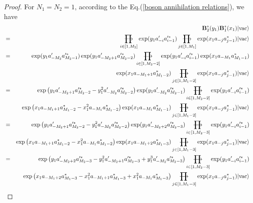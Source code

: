 \documentclass[11pt,reqno]{amsart}
\numberwithin{equation}{section}
\def\rprod{\mathop{\prod{\mkern-28.0mu}{\mathbf\longrightarrow}}}
\begin{document}
\begin{proof}
For $N_{1}=N_{2}=1$, according to the Eq.(\ref{boson annihilation relations}), we have
\begin{eqnarray}
&&\mathbf{B}^{\ast}_{2}(y_{1})\mathbf{B}^{\ast}_{1}(x_{1})|\text{vac}\rangle\notag\\
&=&\rprod\limits
_{i\in[1,M_{2}]}\exp(y_{1}a^{\prime}_{-i}a^{\prime\ast}_{i-1})\rprod\limits
_{j\in[1,M_{1}]}\exp(x_{1}a_{-j}a^{\ast}_{j-1})|\text{vac}\rangle\notag\\
&=&\exp(y_{1}a^{\prime}_{-M_{2}}a^{\prime\ast}_{M_{2}-1})
\exp(y_{1}a^{\prime}_{-M_{2}+1}a^{\prime\ast}_{M_{2}-2})\rprod\limits
_{i\in[1,M_{2}-2]}\exp(y_{1}a^{\prime}_{-i}a^{\prime\ast}_{i-1})\exp(x_{1}a_{-M_{1}}
a^{\ast}_{M_{1}-1})\notag\\
&&\exp(x_{1}a_{-M_{1}+1}a^{\ast}_{M_{1}-2})\rprod\limits
_{j\in[1,M_{1}-2]}\exp(x_{1}a_{-j}a^{\ast}_{j-1})|\text{vac}\rangle\notag\\
&=&\exp\left(y_{1}a^{\prime}_{-M_{2}+1}a^{\prime\ast}_{M_{2}-2}-y^{2}_{1}
a^{\prime}_{-M_{2}}a^{\prime\ast}_{M_{2}-2}\right)
\exp(y_{1}a^{\prime}_{-M_{2}}a^{\prime\ast}_{M_{2}-1})\rprod\limits
_{i\in[1,M_{2}-2]}\exp(y_{1}a^{\prime}_{-i}a^{\prime\ast}_{i-1})\notag\\
&&\exp\left(x_{1}a_{-M_{1}+1}a^{\ast}_{M_{1}-2}-x^{2}_{1}a_{-M_{1}}a^{\ast}_{M_{1}-2}\right)
\exp(x_{1}a_{-M_{1}}a^{\ast}_{M_{1}-1})\rprod\limits
_{j\in[1,M_{1}-2]}\exp(x_{1}a_{-j}a^{\ast}_{j-1})|\text{vac}\rangle\notag\\
&=&\exp\left(y_{1}a^{\prime}_{-M_{2}+1}a^{\prime\ast}_{M_{2}-2}-y^{2}_{1}
a^{\prime}_{-M_{2}}a^{\prime\ast}_{M_{2}-2}\right)\exp(y_{1}a^{\prime}_{-M_{2}+2}
a^{\prime\ast}_{M_{2}-3})\rprod\limits
_{i\in[1,M_{2}-3]}\exp(y_{1}a^{\prime}_{-i}a^{\prime\ast}_{i-1})\notag\\
&&\exp\left(x_{1}a_{-M_{1}+1}a^{\ast}_{M_{1}-2}-x^{2}_{1}a_{-M_{1}}a^{\ast}_{M_{1}-2}\right)
\exp(x_{1}a_{-M_{1}+2}a^{\ast}_{M_{1}-3})\rprod\limits
_{j\in[1,M_{1}-3]}\exp(x_{1}a_{-j}a^{\ast}_{j-1})|\text{vac}\rangle\notag\\
&=&\exp\left(y_{1}a^{\prime}_{-M_{2}+2}a^{\prime\ast}_{M_{2}-3}-y^{2}_{1}
a^{\prime}_{-M_{2}+1}a^{\prime\ast}_{M_{2}-3}+y^{3}_{1}a^{\prime}_{-M_{2}}
a^{\prime\ast}_{M_{2}-3}\right)\rprod\limits
_{i\in[1,M_{2}-3]}\exp(y_{1}a^{\prime}_{-i}a^{\prime\ast}_{i-1})\notag\\
&&\exp\left(x_{1}a_{-M_{1}+2}a^{\ast}_{M_{1}-3}-x^{2}_{1}a_{-M_{1}+1}a^{\ast}_{M_{1}-3}
+x^{2}_{1}a_{-M_{1}}a^{\ast}_{M_{1}-3}\right)\rprod\limits
_{j\in[1,M_{1}-3]}\exp(x_{1}a_{-j}a^{\ast}_{j-1})|\text{vac}\rangle\notag\\

\end{eqnarray}
\end{proof}
\end{document}
